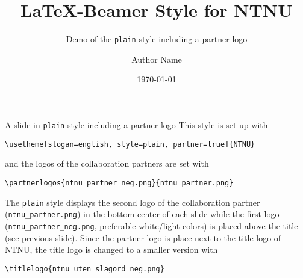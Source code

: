 \documentclass[aspectratio=169]{beamer}
\title{\LaTeX{}-Beamer Style for NTNU}
\subtitle{Demo of the  \texttt{plain} style including a partner logo}
\author{Author Name}
\date{\today}
\begin{document}
	\maketitle
	\begin{frame}[fragile]{A slide in \texttt{plain} style including a partner logo}
		This style is set up with

		\lstinline!\usetheme[slogan=english, style=plain, partner=true]{NTNU}!

		and the logos of the collaboration partners are set with

		\lstinline!\partnerlogos{ntnu_partner_neg.png}{ntnu_partner.png}!

		The \texttt{plain} style displays the second logo of the
		collaboration partner (\lstinline!ntnu_partner.png!) in the
		bottom center of each slide while the first logo
		(\lstinline!ntnu_partner_neg.png!, preferable white/light colors)
		is placed above the title (see previous slide). Since the partner
		logo is place next to the title logo of NTNU, the title logo is
		changed to a smaller version with

		\lstinline!\titlelogo{ntnu_uten_slagord_neg.png}!
	\end{frame}
\end{document}
